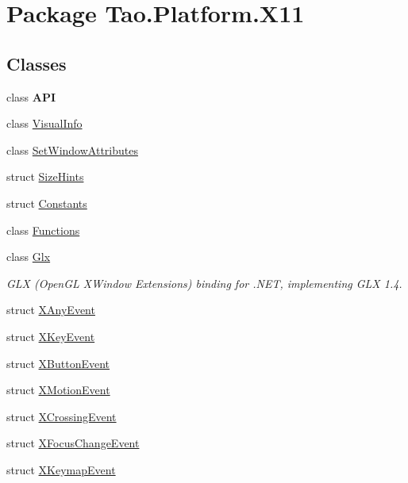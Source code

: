 \hypertarget{namespace_tao_1_1_platform_1_1_x11}{
\section{Package Tao.Platform.X11}
\label{namespace_tao_1_1_platform_1_1_x11}
}
\subsection*{Classes}
\begin{DoxyCompactItemize}
\item 
class {\bfseries API}
\item 
class \hyperlink{class_tao_1_1_platform_1_1_x11_1_1_visual_info}{VisualInfo}
\item 
class \hyperlink{class_tao_1_1_platform_1_1_x11_1_1_set_window_attributes}{SetWindowAttributes}
\item 
struct \hyperlink{struct_tao_1_1_platform_1_1_x11_1_1_size_hints}{SizeHints}
\item 
struct \hyperlink{struct_tao_1_1_platform_1_1_x11_1_1_constants}{Constants}
\item 
class \hyperlink{class_tao_1_1_platform_1_1_x11_1_1_functions}{Functions}
\item 
class \hyperlink{class_tao_1_1_platform_1_1_x11_1_1_glx}{Glx}
\begin{DoxyCompactList}\small\item\em GLX (OpenGL XWindow Extensions) binding for .NET, implementing GLX 1.4. \item\end{DoxyCompactList}\item 
struct \hyperlink{struct_tao_1_1_platform_1_1_x11_1_1_x_any_event}{XAnyEvent}
\item 
struct \hyperlink{struct_tao_1_1_platform_1_1_x11_1_1_x_key_event}{XKeyEvent}
\item 
struct \hyperlink{struct_tao_1_1_platform_1_1_x11_1_1_x_button_event}{XButtonEvent}
\item 
struct \hyperlink{struct_tao_1_1_platform_1_1_x11_1_1_x_motion_event}{XMotionEvent}
\item 
struct \hyperlink{struct_tao_1_1_platform_1_1_x11_1_1_x_crossing_event}{XCrossingEvent}
\item 
struct \hyperlink{struct_tao_1_1_platform_1_1_x11_1_1_x_focus_change_event}{XFocusChangeEvent}
\item 
struct \hyperlink{struct_tao_1_1_platform_1_1_x11_1_1_x_keymap_event}{XKeymapEvent}

\end{DoxyCompactItemize}
